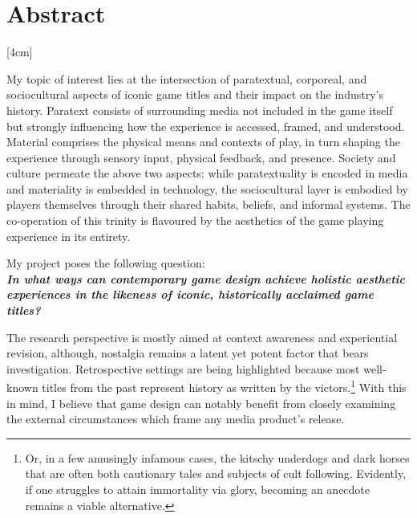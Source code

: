 \documentclass[12pt,oneside]{book}
\begin{document}
\chapter*{\centering\vspace{-1cm} Abstract}
\reversemarginpar{}[4cm]
\begin{center}\vspace{-1cm}
    My topic of interest lies at the intersection of paratextual, corporeal, and sociocultural aspects of iconic game titles and their impact on the industry’s history.
    Paratext consists of surrounding media not included in the game itself but strongly influencing how the experience is accessed, framed, and understood.
    Material comprises the physical means and contexts of play, in turn shaping the experience through sensory input, physical feedback, and presence. 
    Society and culture permeate the above two aspects: while paratextuality is encoded in media and materiality is embedded in technology, the sociocultural layer is embodied by players themselves through their shared habits, beliefs, and informal systems.
    The co-operation of this trinity is flavoured by the aesthetics of the game playing experience in its entirety. 
    \par My project poses the following question:\vspace{2mm}
    \textbf{\textit{\\In what ways can contemporary game design achieve holistic aesthetic experiences in the likeness of iconic, historically acclaimed game titles?}}\vspace{2mm}\par 
    The research perspective is mostly aimed at context awareness and experiential revision, although, nostalgia remains a latent yet potent factor that bears investigation.
    Retrospective settings are being highlighted because most well-known titles from the past represent history as written by the victors.\footnote{Or, in a few amusingly infamous cases, the kitschy underdogs and dark horses that are often both cautionary tales and subjects of cult following. Evidently, if one struggles to attain immortality via glory, becoming an anecdote remains a viable alternative.}
    With this in mind, I believe that game design can notably benefit from closely examining the external circumstances which frame any media product's release.\par

\end{center}
\end{document}
